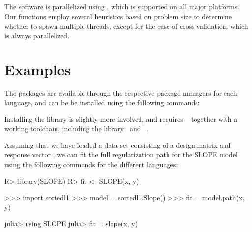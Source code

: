 \documentclass[article]{jss}
\begin{document}
The software is parallelized using , which is supported on all
major platforms. Our functions employ several heuristics based on problem size to
determine whether to spawn multiple threads, except
for the case of cross-validation, which is always parallelized.

\section{Examples}\label{sec:examples}

The packages are
available through the respective package managers for each language, and can be
be installed using the following commands:
\begin{description}[labelwidth=8ex]
  \item[\proglang{R}] 
  \item[\proglang{Python}] 
  \item[\proglang{Julia}] 
\end{description}

Installing the  library is slightly more involved, and requires
~\citep{kitware2025} together with a working  toolchain, including
the  library~\citep{guennebaud2010a} and ~\citep{dagum1998}.

Assuming that we have loaded a data set consisting of a design
matrix  and response vector , we can fit the full regularization
path for the SLOPE model using the following commands for the different languages:

\begin{minipage}[t]{0.24\textwidth}%
  \textbf{}
  \begin{Code}
R> library(SLOPE)
R> fit <- SLOPE(x, y)
  \end{Code}
\end{minipage}
\hfill
\begin{minipage}[t]{0.33\textwidth}%
  \textbf{}
  \begin{Code}
>>> import sortedl1
>>> model = sortedl1.Slope()
>>> fit = model.path(x, y)
  \end{Code}
\end{minipage}
\hfill
\begin{minipage}[t]{0.32\textwidth}%
  \textbf{}
  \begin{Code}
julia> using SLOPE
julia> fit = slope(x, y)
  \end{Code}
\end{minipage}
\end{document}
